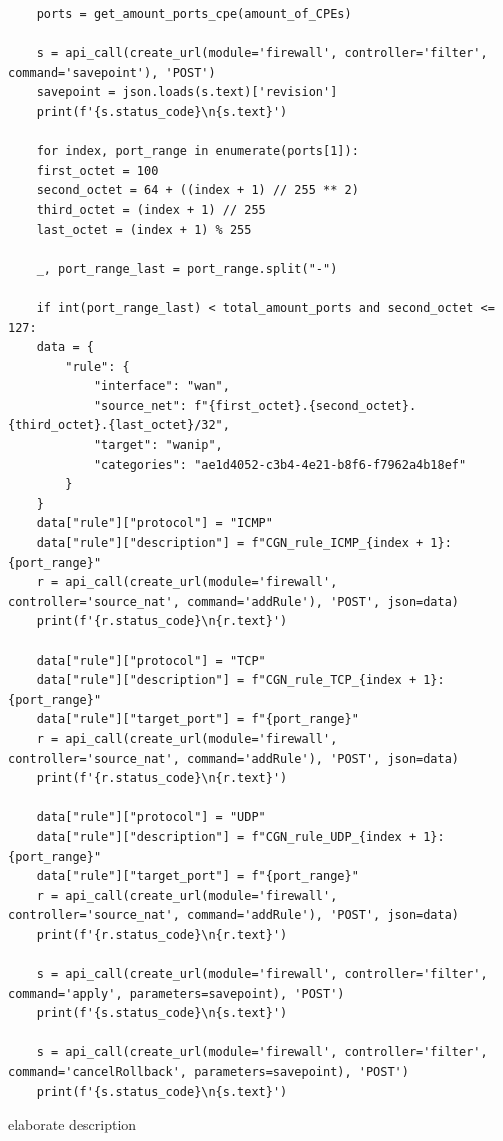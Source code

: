 \begin{verbatim}
    ports = get_amount_ports_cpe(amount_of_CPEs)

    s = api_call(create_url(module='firewall', controller='filter', command='savepoint'), 'POST')
    savepoint = json.loads(s.text)['revision']
    print(f'{s.status_code}\n{s.text}')

    for index, port_range in enumerate(ports[1]):
    first_octet = 100
    second_octet = 64 + ((index + 1) // 255 ** 2)
    third_octet = (index + 1) // 255
    last_octet = (index + 1) % 255

    _, port_range_last = port_range.split("-")

    if int(port_range_last) < total_amount_ports and second_octet <= 127:
    data = {
        "rule": {
            "interface": "wan",
            "source_net": f"{first_octet}.{second_octet}.{third_octet}.{last_octet}/32",
            "target": "wanip",
            "categories": "ae1d4052-c3b4-4e21-b8f6-f7962a4b18ef"
        }
    }
    data["rule"]["protocol"] = "ICMP"
    data["rule"]["description"] = f"CGN_rule_ICMP_{index + 1}: {port_range}"
    r = api_call(create_url(module='firewall', controller='source_nat', command='addRule'), 'POST', json=data)
    print(f'{r.status_code}\n{r.text}')

    data["rule"]["protocol"] = "TCP"
    data["rule"]["description"] = f"CGN_rule_TCP_{index + 1}: {port_range}"
    data["rule"]["target_port"] = f"{port_range}"
    r = api_call(create_url(module='firewall', controller='source_nat', command='addRule'), 'POST', json=data)
    print(f'{r.status_code}\n{r.text}')

    data["rule"]["protocol"] = "UDP"
    data["rule"]["description"] = f"CGN_rule_UDP_{index + 1}: {port_range}"
    data["rule"]["target_port"] = f"{port_range}"
    r = api_call(create_url(module='firewall', controller='source_nat', command='addRule'), 'POST', json=data)
    print(f'{r.status_code}\n{r.text}')

    s = api_call(create_url(module='firewall', controller='filter', command='apply', parameters=savepoint), 'POST')
    print(f'{s.status_code}\n{s.text}')

    s = api_call(create_url(module='firewall', controller='filter', command='cancelRollback', parameters=savepoint), 'POST')
    print(f'{s.status_code}\n{s.text}')
\end{verbatim}
\begin{listing}[!htbp]
    \caption[Python CGN code]{elaborate description}
    \label{code:PythonCGN}
\end{listing}

